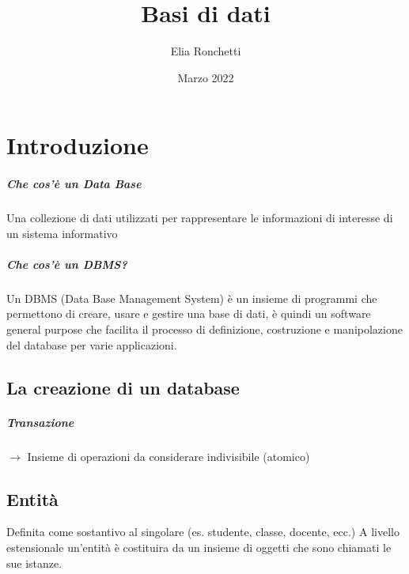 \documentclass[12pt, a4paper, openany]{book}
\begin{document}
\title{Basi di dati}
\author{Elia Ronchetti}
\date{Marzo 2022}

\maketitle
\tableofcontents

\chapter{Introduzione}
\paragraph{Che cos'è un Data Base}
Una collezione di dati utilizzati per rappresentare le informazioni di interesse di un sistema informativo
\paragraph{Che cos'è un DBMS?}
Un DBMS (Data Base Management System) è un insieme di programmi che permettono di creare, usare e gestire una base di dati, è quindi un software
general purpose che facilita il processo di definizione, costruzione e manipolazione del database per varie applicazioni.

\section{La creazione di un database}
\paragraph{Transazione} $\to$ Insieme di operazioni da considerare indivisibile (atomico)

\section{Entità}
Definita come sostantivo al singolare (es. studente, classe, docente, ecc.)
A livello estensionale un'entità è costituira da un insieme di oggetti che sono chiamati le sue istanze.
\end{document}

